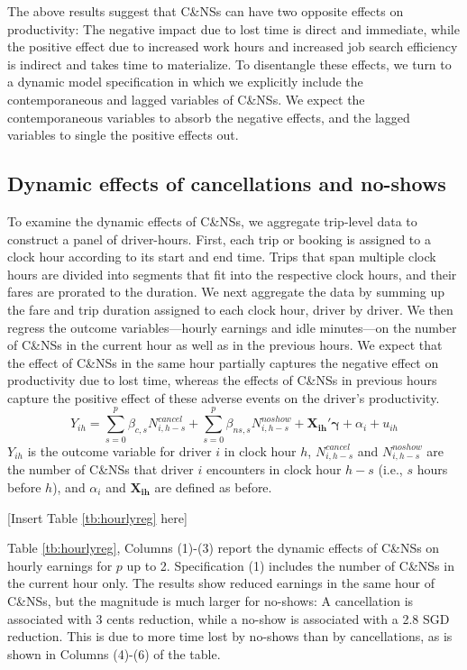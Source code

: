 \documentclass[reviewmode]{AEA}
\begin{document}
The above results suggest that C\&NSs can have two opposite effects on productivity: The negative impact due to lost time is direct and immediate, while the positive effect due to increased work hours and increased job search efficiency is indirect and takes time to materialize. To disentangle these effects, we turn to a dynamic model specification in which we explicitly include the contemporaneous and lagged variables of C\&NSs. We expect the contemporaneous variables to absorb the negative effects, and the lagged variables to single the positive effects out.



\subsection{Dynamic effects of cancellations and no-shows}
To examine the dynamic effects of C\&NSs, we aggregate trip-level data to construct a panel of driver-hours. First, each trip or booking is assigned to a clock hour according to its start and end time. Trips that span multiple clock hours are divided into segments that fit into the respective clock hours, and their fares are prorated to the duration. We next aggregate the data by summing up the fare and trip duration assigned to each clock hour, driver by driver. We then regress the outcome variables---hourly earnings and idle minutes---on the number of C\&NSs in the current hour as well as in the previous hours. We expect that the effect of C\&NSs in the same hour partially captures the negative effect on productivity due to lost time, whereas the effects of C\&NSs in previous hours capture the positive effect of these adverse events on the driver's productivity.
\begin{equation}
Y_{ih} = \sum_{s=0}^p \beta_{c,s} N^{cancel}_{i,h-s} + \sum_{s=0}^p \beta_{ns,s} N^{noshow}_{i,h-s} +  \mathbf{X_{ih}}'\mathbf{\gamma} + \alpha_i + u_{ih}
\end{equation}
$Y_{ih}$ is the outcome variable for driver $i$ in clock hour $h$, $N^{cancel}_{i, h-s}$ and $N^{noshow}_{i, h-s}$ are the number of C\&NSs that driver $i$ encounters in clock hour $h-s$ (i.e., $s$ hours before $h$), and $\alpha_i$ and $\mathbf{X_{ih}}$ are defined as before.

\begin{center}
	[Insert Table \ref{tb:hourlyreg} here]
\end{center}

Table \ref{tb:hourlyreg}, Columns (1)-(3) report the dynamic effects of C\&NSs on hourly earnings for $p$ up to 2. Specification (1) includes the number of C\&NSs in the current hour only. The results show reduced earnings in the same hour of C\&NSs, but the magnitude is much larger for no-shows: A cancellation is associated with 3 cents reduction, while a no-show is associated with a 2.8 SGD reduction. This is due to more time lost by no-shows than by cancellations, as is shown in Columns (4)-(6) of the table. 
\end{document}
